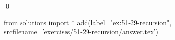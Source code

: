 
\begin{ex}
  \label{ex:51-29-recursion}
  
  \qed
\end{ex}
\begin{python0}
from solutions import *
add(label="ex:51-29-recursion",
    srcfilename='exercises/51-29-recursion/answer.tex')
\end{python0}
